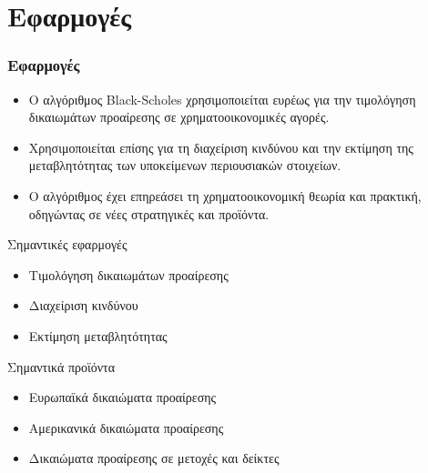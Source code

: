 \section{Εφαρμογές}
\begin{frame}
  \frametitle{Εφαρμογές}
  \begin{itemize}
    \item Ο αλγόριθμος Black-Scholes χρησιμοποιείται ευρέως για την τιμολόγηση δικαιωμάτων προαίρεσης σε χρηματοοικονομικές αγορές.
    \item Χρησιμοποιείται επίσης για τη διαχείριση κινδύνου και την εκτίμηση της μεταβλητότητας των υποκείμενων περιουσιακών στοιχείων.
    \item Ο αλγόριθμος έχει επηρεάσει τη χρηματοοικονομική θεωρία και πρακτική, οδηγώντας σε νέες στρατηγικές και προϊόντα.
  \end{itemize}
  \begin{block}{Σημαντικές εφαρμογές}
    \begin{itemize}
      \item Τιμολόγηση δικαιωμάτων προαίρεσης
      \item Διαχείριση κινδύνου
      \item Εκτίμηση μεταβλητότητας
    \end{itemize}
  \end{block}
  \begin{block}{Σημαντικά προϊόντα}
    \begin{itemize}
      \item Ευρωπαϊκά δικαιώματα προαίρεσης
      \item Αμερικανικά δικαιώματα προαίρεσης
      \item Δικαιώματα προαίρεσης σε μετοχές και δείκτες
    \end{itemize}
  \end{block}
\end{frame}
